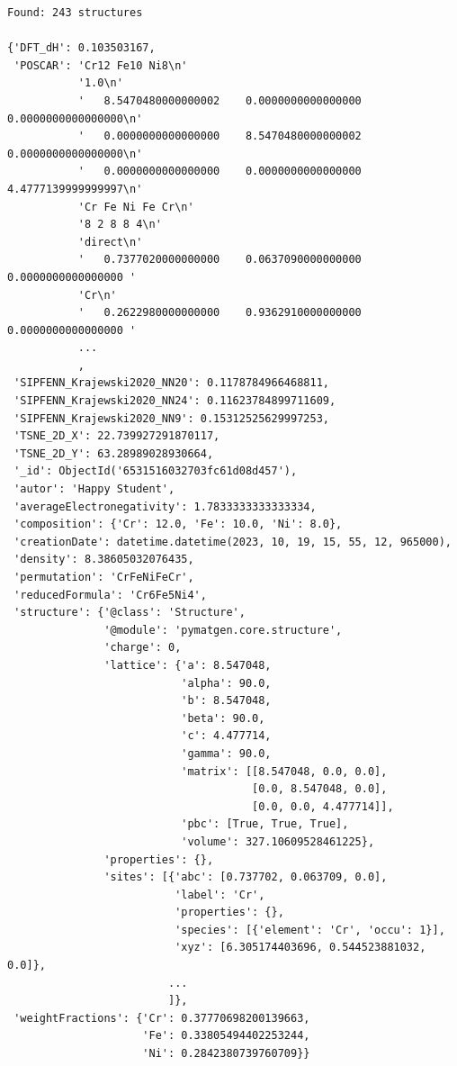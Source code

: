 \begin{verbatim}
Found: 243 structures

{'DFT_dH': 0.103503167,
 'POSCAR': 'Cr12 Fe10 Ni8\n'
           '1.0\n'
           '   8.5470480000000002    0.0000000000000000    0.0000000000000000\n'
           '   0.0000000000000000    8.5470480000000002    0.0000000000000000\n'
           '   0.0000000000000000    0.0000000000000000    4.4777139999999997\n'
           'Cr Fe Ni Fe Cr\n'
           '8 2 8 8 4\n'
           'direct\n'
           '   0.7377020000000000    0.0637090000000000    0.0000000000000000 '
           'Cr\n'
           '   0.2622980000000000    0.9362910000000000    0.0000000000000000 '
           ...
           ,
 'SIPFENN_Krajewski2020_NN20': 0.1178784966468811,
 'SIPFENN_Krajewski2020_NN24': 0.11623784899711609,
 'SIPFENN_Krajewski2020_NN9': 0.15312525629997253,
 'TSNE_2D_X': 22.739927291870117,
 'TSNE_2D_Y': 63.28989028930664,
 '_id': ObjectId('6531516032703fc61d08d457'),
 'autor': 'Happy Student',
 'averageElectronegativity': 1.7833333333333334,
 'composition': {'Cr': 12.0, 'Fe': 10.0, 'Ni': 8.0},
 'creationDate': datetime.datetime(2023, 10, 19, 15, 55, 12, 965000),
 'density': 8.38605032076435,
 'permutation': 'CrFeNiFeCr',
 'reducedFormula': 'Cr6Fe5Ni4',
 'structure': {'@class': 'Structure',
               '@module': 'pymatgen.core.structure',
               'charge': 0,
               'lattice': {'a': 8.547048,
                           'alpha': 90.0,
                           'b': 8.547048,
                           'beta': 90.0,
                           'c': 4.477714,
                           'gamma': 90.0,
                           'matrix': [[8.547048, 0.0, 0.0],
                                      [0.0, 8.547048, 0.0],
                                      [0.0, 0.0, 4.477714]],
                           'pbc': [True, True, True],
                           'volume': 327.10609528461225},
               'properties': {},
               'sites': [{'abc': [0.737702, 0.063709, 0.0],
                          'label': 'Cr',
                          'properties': {},
                          'species': [{'element': 'Cr', 'occu': 1}],
                          'xyz': [6.305174403696, 0.544523881032, 0.0]},
                         ...
                         ]},
 'weightFractions': {'Cr': 0.37770698200139663,
                     'Fe': 0.33805494402253244,
                     'Ni': 0.2842380739760709}}
\end{verbatim}


